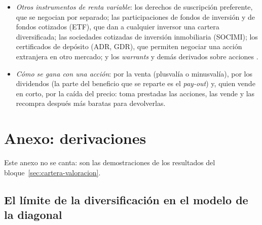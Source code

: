 \documentclass[11pt]{article}
\begin{document}
\begin{itemize}
\begin{itemize}
  \item \emph{de crecimiento} y \emph{de valor}: los primeros cotizan con múltiplos altos por la expectativa de crecimiento; los segundos, con múltiplos bajos respecto de su valor contable (el factor HML de \ref{sec:apt});
  \item \emph{especulativos}: poca capitalización y mucha volatilidad.
  \end{itemize}
\item \emph{Otros instrumentos de renta variable}: los derechos de suscripción preferente, que se negocian por separado; las participaciones de fondos de inversión y de fondos cotizados (ETF), que dan a cualquier inversor una cartera diversificada; las sociedades cotizadas de inversión inmobiliaria (SOCIMI); los certificados de depósito (ADR, GDR), que permiten negociar una acción extranjera en otro mercado; y los \emph{warrants} y demás derivados sobre acciones .
\item \emph{Cómo se gana con una acción}: por la venta (plusvalía o minusvalía), por los dividendos (la parte del beneficio que se reparte es el \emph{pay-out}) y, quien vende en corto, por la caída del precio: toma prestadas las acciones, las vende y las recompra después más baratas para devolverlas.
\end{itemize}

\section{Anexo: derivaciones}\label{anexo:derivaciones}

Este anexo no se canta: son las demostraciones de los resultados del bloque~\ref{sec:cartera-valoracion}.

\subsection{El límite de la diversificación en el modelo de la diagonal}\label{anexo:diagonal}
\end{document}
